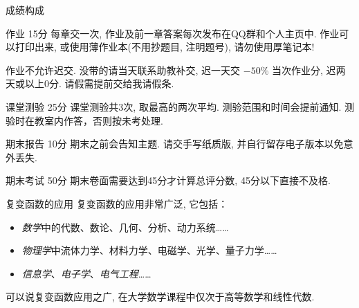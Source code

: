 \begin{frame}{成绩构成}
	\onslide<+->
	\begin{block*}{作业 15分}
		每章交一次, 作业及前一章答案每次发布在QQ群和个人主页中. 
		作业可以打印出来, 或使用薄作业本(不用抄题目, 注明题号), 请勿使用厚笔记本! 

		\alert{作业不允许迟交}. 没带的请当天联系助教补交, 迟一天交 $-50\%$ 当次作业分, 迟两天或以上0分. 请假需提前交给我请假条. 
	\end{block*}

	\onslide<+->
	\begin{block*}{课堂测验 25分}
		课堂测验共3次, 取最高的两次平均. 测验范围和时间会提前通知. \alert{测验时在教室内作答，否则按未考处理}. 
	\end{block*}

	\onslide<+->
	\begin{block*}{期末报告 10分}
		期末之前会告知主题. 请交手写纸质版, 并自行留存电子版本以免意外丢失. 
	\end{block*}

	\onslide<+->
	\begin{block*}{期末考试 50分}
		期末卷面需要达到45分才计算总评分数, 45分以下直接不及格. 
	\end{block*}
\end{frame}


\begin{frame}{复变函数的应用}
	\onslide<+->
	复变函数的应用非常广泛, 它包括：
	\begin{itemize}
		\item \emph{数学}中的代数、数论、几何、分析、动力系统……
		\item \emph{物理学}中流体力学、材料力学、电磁学、光学、量子力学……
		\item \emph{信息学}、\emph{电子学}、\emph{电气工程}……
	\end{itemize}
	\onslide<+->
	可以说复变函数应用之广, 在大学数学课程中仅次于高等数学和线性代数. 
\end{frame}


